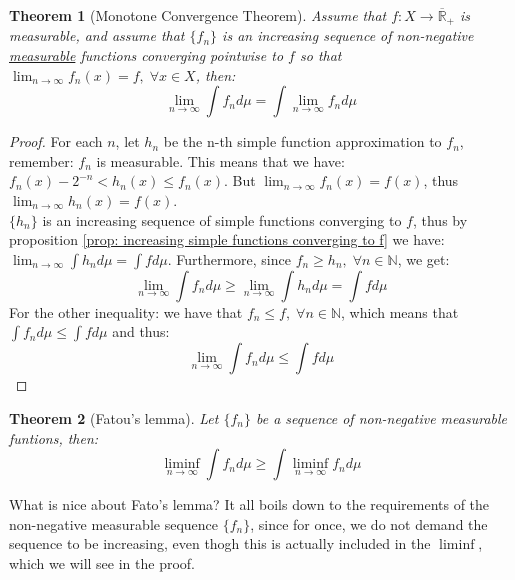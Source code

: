 \documentclass{article}
\newcommand{\N}{\mathbb{N}}
\newcommand{\Rbar}{\overline{\mathbb{R}}}%
\newtheorem{proof}{Proof}
\newtheorem{theorem}{Theorem}
\begin{document}
\begin{theorem}[Monotone Convergence Theorem]
\label{thm: Monotone Convergence Theorem}
Assume that $f:X\to \Rbar_{+}$ is measurable, and assume that $\{f_{n}\}$ is an increasing sequence of non-negative \underline{measurable} functions converging pointwise to $f$ so that $\lim_{n\to \infty}f_{n}(x) = f,\; \forall x\in X$, then: 
\[ \lim_{n\to \infty}\int f_{n}d\mu = \int \lim_{n\to \infty}f_{n}d\mu
\]
\end{theorem}

\begin{proof}
For each $n$, let $h_{n}$ be the n-th simple function approximation to $f_{n}$, remember: $f_{n}$ is measurable. This means that we have: \\ 
$f_{n}(x) -2^{-n} < h_{n}(x) \leq f_{n}(x)$. But $\lim_{n\to \infty}f_{n}(x) = f(x)$, thus $\lim_{n\to \infty} h_{n}(x) = f(x)$.\\ 
$\{h_{n}\}$ is an increasing sequence of simple functions converging to $f$, thus by proposition \ref{prop: increasing simple functions converging to f} we have: 
$\lim_{n\to \infty}\int h_{n}d\mu = \int fd\mu$. Furthermore, since $f_{n}\geq h_{n}, \; \forall n\in \N$, we get: 
\[\lim_{n\to \infty}\int f_{n}d\mu \geq \lim_{n\to \infty}\int h_{n}d\mu = \int fd\mu
\]
For the other inequality: we have that $f_{n}\leq f, \; \forall n\in \N$, which means that $\int f_{n}d\mu \leq \int fd\mu$ and thus: 
\[\lim_{n\to \infty}\int f_{n}d\mu \leq \int fd\mu
\]
\end{proof}


\begin{theorem}[Fatou's lemma]
\label{lemma: Fatou's lemma}
Let $\{f_{n}\}$ be a sequence of non-negative measurable funtions, then: 
\[\liminf_{n\to \infty}\int f_{n}d\mu \geq \int \liminf_{n\to \infty}f_{n}d\mu
\]
\end{theorem}

What is nice about Fato's lemma? It all boils down to the requirements of the non-negative measurable sequence $\{f_{n}\}$, since for once, we do not demand the sequence to be increasing, even thogh this is actually included in the $\liminf$, which we will see in the proof.
\end{document}
